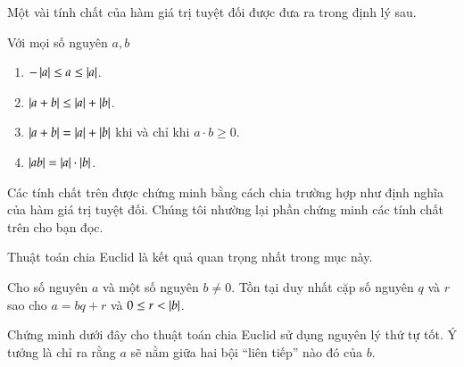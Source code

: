 Một vài tính chất của hàm giá trị tuyệt đối được đưa ra trong định lý sau.
\begin{theorem}
	Với mọi số nguyên $a, b$
	\begin{enumerate}[label={(\roman*)}]
		\item $-\left\vert{a}\right\vert\leq a \leq \left\vert{a}\right\vert$.
		\item $\left\vert{a + b}\right\vert\leq \left\vert{a}\right\vert + \left\vert{b}\right\vert$.
		\item $\left\vert{a + b}\right\vert = \left\vert{a}\right\vert + \left\vert{b}\right\vert$ khi và chỉ khi $a\cdot b\geq 0$.
		\item $\left\vert{ab}\right\vert = \left\vert{a}\right\vert\cdot\left\vert{b}\right\vert$.
	\end{enumerate}
\end{theorem}

Các tính chất trên được chứng minh bằng cách chia trường hợp như định nghĩa của hàm giá trị tuyệt đối. Chúng tôi nhường lại phần chứng minh các tính chất trên cho bạn đọc.

Thuật toán chia Euclid là kết quả quan trọng nhất trong mục này.
\begin{theorem}
	Cho số nguyên $a$ và một số nguyên $b\ne 0$. Tồn tại duy nhất cặp số nguyên $q$ và $r$ sao cho $a = bq + r$ và $0\leq r < \left\vert{b}\right\vert$.
\end{theorem}

Chứng minh dưới đây cho thuật toán chia Euclid sử dụng nguyên lý thứ tự tốt. Ý tưởng là chỉ ra rằng $a$ sẽ nằm giữa hai bội ``liên tiếp'' nào đó của $b$.

